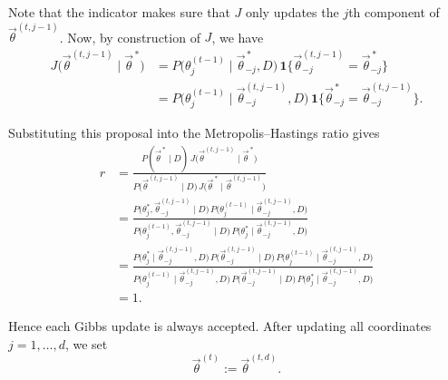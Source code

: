 \documentclass[11pt, titlepage]{article} %
\numberwithin{equation}{section}
\theoremstyle{definition}
\numberwithin{assumption}{section}
\begin{document}
Note that the indicator makes sure that $J$ only updates the $j$th component of $\vec{\theta}^{(t,j-1)}$. Now, by construction of $J$, we have
\begin{align*}
J\bigl(\vec{\theta}^{(t,j-1)} \mid \vec{\theta}^{\,*}\bigr)
&=
P\bigl(\theta_j^{(t-1)} \mid \vec{\theta}_{-j}^{\,*}, D\bigr)
\,\mathbf{1}\bigl\{\vec{\theta}_{-j}^{(t,j-1)}=\vec{\theta}_{-j}^{\,*}\bigr\} \\
&=
P\bigl(\theta_j^{(t-1)} \mid \vec{\theta}_{-j}^{(t,j-1)}, D\bigr)
\,\mathbf{1}\bigl\{\vec{\theta}_{-j}^{\,*}=\vec{\theta}_{-j}^{(t,j-1)}\bigr\}.
\end{align*}

Substituting this proposal into the Metropolis--Hastings ratio gives
\begin{align*}
r
&=
\frac{
P(\vec{\theta}^{\,*} \mid D)\,
J\bigl(\vec{\theta}^{(t,j-1)} \mid \vec{\theta}^{\,*}\bigr)
}{
P\bigl(\vec{\theta}^{(t,j-1)} \mid D\bigr)\,
J\bigl(\vec{\theta}^{\,*} \mid \vec{\theta}^{(t,j-1)}\bigr)
} \\
&=
\frac{
P\bigl(\theta_j^*,\vec{\theta}_{-j}^{(t,j-1)} \mid D\bigr)\,
P\bigl(\theta_j^{(t-1)} \mid \vec{\theta}_{-j}^{(t,j-1)}, D\bigr)
}{
P\bigl(\theta_j^{(t-1)},\vec{\theta}_{-j}^{(t,j-1)} \mid D\bigr)\,
P\bigl(\theta_j^* \mid \vec{\theta}_{-j}^{(t,j-1)}, D\bigr)
} \\
&=
\frac{
P\bigl(\theta_j^* \mid \vec{\theta}_{-j}^{(t,j-1)}, D\bigr)\,
P\bigl(\vec{\theta}_{-j}^{(t,j-1)} \mid D\bigr)\,
P\bigl(\theta_j^{(t-1)} \mid \vec{\theta}_{-j}^{(t,j-1)}, D\bigr)
}{
P\bigl(\theta_j^{(t-1)} \mid \vec{\theta}_{-j}^{(t,j-1)}, D\bigr)\,
P\bigl(\vec{\theta}_{-j}^{(t,j-1)} \mid D\bigr)\,
P\bigl(\theta_j^* \mid \vec{\theta}_{-j}^{(t,j-1)}, D\bigr)
} \\
&= 1.
\end{align*}

Hence each Gibbs update is always accepted. After updating all coordinates $j=1,\dots,d$, we set
\begin{equation*}
\vec{\theta}^{(t)}:=\vec{\theta}^{(t,d)}.
\end{equation*}
\end{document}

